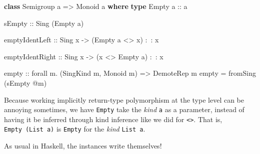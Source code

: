 \documentclass[]{article}
\newenvironment{Shaded}{}{}
\newcommand{\KeywordTok}[1]{\textcolor[rgb]{0.00,0.44,0.13}{\textbf{{#1}}}}
\newcommand{\DataTypeTok}[1]{\textcolor[rgb]{0.56,0.13,0.00}{{#1}}}
\newcommand{\OtherTok}[1]{\textcolor[rgb]{0.00,0.44,0.13}{{#1}}}
\newcommand{\FunctionTok}[1]{\textcolor[rgb]{0.02,0.16,0.49}{{#1}}}
\newcommand{\NormalTok}[1]{{#1}}
\begin{document}
\begin{Shaded}
\begin{Highlighting}[]
\KeywordTok{class} \DataTypeTok{Semigroup} \NormalTok{a }\OtherTok{=>} \DataTypeTok{Monoid} \NormalTok{a }\KeywordTok{where}
    \KeywordTok{type} \DataTypeTok{Empty}\OtherTok{ a ::} \NormalTok{a}

\OtherTok{    sEmpty ::} \DataTypeTok{Sing} \NormalTok{(}\DataTypeTok{Empty} \NormalTok{a)}

    \NormalTok{emptyIdentLeft}
\OtherTok{        ::} \DataTypeTok{Sing} \NormalTok{x}
        \OtherTok{->} \NormalTok{(}\DataTypeTok{Empty} \NormalTok{a }\FunctionTok{<>} \NormalTok{x) }\FunctionTok{:~:} \NormalTok{x}

    \NormalTok{emptyIdentRight}
\OtherTok{        ::} \DataTypeTok{Sing} \NormalTok{x}
        \OtherTok{->} \NormalTok{(x }\FunctionTok{<>} \DataTypeTok{Empty} \NormalTok{a) }\FunctionTok{:~:} \NormalTok{x}

\NormalTok{empty}
\OtherTok{    ::} \NormalTok{forall m}\FunctionTok{.} \NormalTok{(}\DataTypeTok{SingKind} \NormalTok{m, }\DataTypeTok{Monoid} \NormalTok{m)}
    \OtherTok{=>} \DataTypeTok{DemoteRep} \NormalTok{m}
\NormalTok{empty }\FunctionTok{=} \NormalTok{fromSing (sEmpty }\FunctionTok{@}\NormalTok{m)}
\end{Highlighting}
\end{Shaded}

Because working implicitly return-type polymorphism at the type level can be
annoying sometimes, we have \texttt{Empty} take the \emph{kind} \texttt{a} as a
parameter, instead of having it be inferred through kind inference like we did
for \texttt{\textless{}\textgreater{}}. That is, \texttt{Empty\ (List\ a)} is
\texttt{Empty} for the \emph{kind} \texttt{List\ a}.

As usual in Haskell, the instances write themselves!
\end{document}
